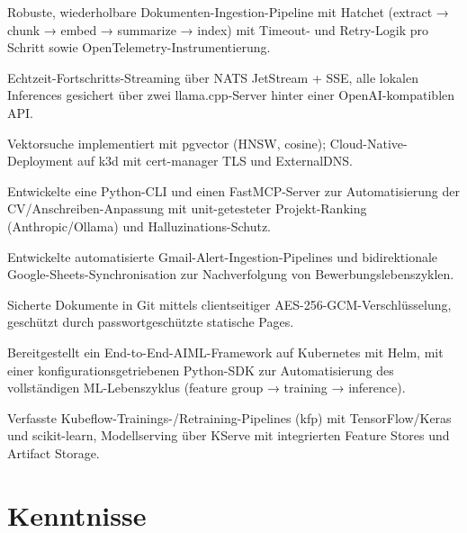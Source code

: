 \documentclass[10pt,a4paper]{resume}
\begin{document}
\bullets
  \item Robuste, wiederholbare Dokumenten-Ingestion-Pipeline mit Hatchet (extract → chunk → embed → summarize → index) mit Timeout- und Retry-Logik pro Schritt sowie OpenTelemetry-Instrumentierung.
  \item Echtzeit-Fortschritts-Streaming über NATS JetStream + SSE, alle lokalen Inferences gesichert über zwei llama.cpp-Server hinter einer OpenAI-kompatiblen API.
  \item Vektorsuche implementiert mit pgvector (HNSW, cosine); Cloud-Native-Deployment auf k3d mit cert-manager TLS und ExternalDNS.
\bulletsend
\vspace{1.0pt}
\bullets
  \item Entwickelte eine Python-CLI und einen FastMCP-Server zur Automatisierung der CV/Anschreiben-Anpassung mit unit-getesteter Projekt-Ranking (Anthropic/Ollama) und Halluzinations-Schutz.
  \item Entwickelte automatisierte Gmail-Alert-Ingestion-Pipelines und bidirektionale Google-Sheets-Synchronisation zur Nachverfolgung von Bewerbungslebenszyklen.
  \item Sicherte Dokumente in Git mittels clientseitiger AES-256-GCM-Verschlüsselung, geschützt durch passwortgeschützte statische Pages.
\bulletsend
\vspace{1.0pt}
\bullets
  \item Bereitgestellt ein End-to-End-AIML-Framework auf Kubernetes mit Helm, mit einer konfigurationsgetriebenen Python-SDK zur Automatisierung des vollständigen ML-Lebenszyklus (feature group → training → inference).
  \item Verfasste Kubeflow-Trainings-/Retraining-Pipelines (kfp) mit TensorFlow/Keras und scikit-learn, Modellserving über KServe mit integrierten Feature Stores und Artifact Storage.
\bulletsend

\section{Kenntnisse}
\end{document}
